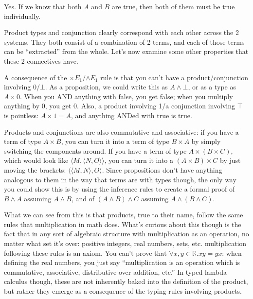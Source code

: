 \documentclass[12pt]{article}
\begin{document}
\begin{prooftree}
\end{prooftree}

Yes. If we know that both $A$ and $B$ are true, then both of them must be true individually.

Product types and conjunction clearly correspond with each other across the 2 systems. They both consist of a combination of 2 terms, and each of those terms can be ``extracted'' from the whole. Let's now examine some other properties that these 2 connectives have.

A consequence of the $\times E_1$/$\land E_1$ rule is that you can't have a product/conjunction involving 0/$\bot$. As a proposition, we could write this as $A \land \bot$, or as a type as $A \times 0$. When you AND anything with false, you get false; when you multiply anything by 0, you get 0. Also, a product involving 1/a conjunction involving $\top$ is pointless: $A \times 1 = A$, and anything ANDed with true is true.

Products and conjunctions are also commutative and associative: if you have a term of type $A \times B$, you can turn it into a term of type $B \times A$ by simply switching the components around. If you have a term of type $A \times (B \times C)$, which would look like $\langle M, \langle N, O \rangle \rangle$, you can turn it into a $(A \times B) \times C$ by just moving the brackets: $\langle \langle M, N \rangle, O \rangle$. Since propositions don't have anything analogous to them in the way that terms are with types though, the only way you could show this is by using the inference rules to create a formal proof of $B \land A$ assuming $A \land B$, and of $(A \land B) \land C$ assuming $A \land (B \land C)$.

What we can see from this is that products, true to their name, follow the same rules that multiplication in math does. What's curious about this though is the fact that in any sort of algebraic structure with multiplication as an operation, no matter what set it's over: positive integers, real numbers, sets, etc. multiplication following these rules is an axiom. You can't prove that $\forall x, y \in \mathbb{R}. xy = yx$: when defining the real numbers, you just say ``multiplication is an operation which is commutative, associative, distributive over addition, etc.'' In typed lambda calculus though, these are not inherently baked into the definition of the product, but rather they emerge as a consequence of the typing rules involving products.
\end{document}
